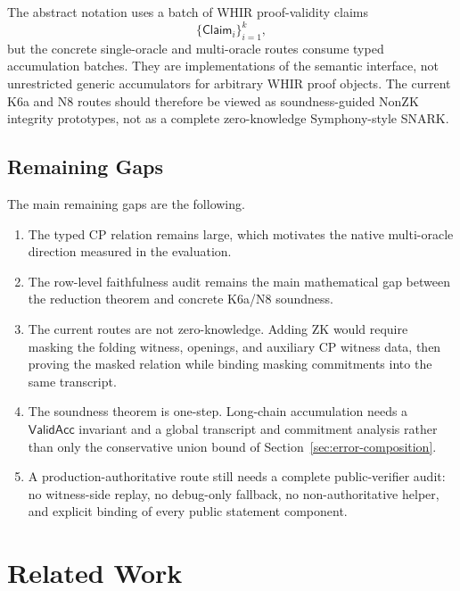 \documentclass[11pt]{article}
\theoremstyle{definition}
\begin{document}
The abstract notation uses a batch of WHIR proof-validity claims
\[
  \{\mathsf{Claim}_i\}_{i=1}^k,
\]
but the concrete single-oracle and multi-oracle routes consume typed
accumulation batches. They are implementations of the semantic interface, not
unrestricted generic accumulators for arbitrary WHIR proof objects. The current
K6a and N8 routes should therefore be viewed as soundness-guided NonZK
integrity prototypes, not as a complete zero-knowledge Symphony-style SNARK.

\subsection{Remaining Gaps}
\label{sec:remaining-gaps}

The main remaining gaps are the following.

\begin{enumerate}
  \item The typed CP relation remains large, which motivates the native
        multi-oracle direction measured in the evaluation.
  \item The row-level faithfulness audit remains the main mathematical gap
        between the reduction theorem and concrete K6a/N8 soundness.
  \item The current routes are not zero-knowledge. Adding ZK would require
        masking the folding witness, openings, and auxiliary CP witness data,
        then proving the masked relation while binding masking commitments into
        the same transcript.
  \item The soundness theorem is one-step. Long-chain accumulation needs a
        \(\mathsf{ValidAcc}\) invariant and a global transcript and commitment
        analysis rather than only the conservative union bound of
        Section~\ref{sec:error-composition}.
  \item A production-authoritative route still needs a complete public-verifier
        audit: no witness-side replay, no debug-only fallback, no
        non-authoritative helper, and explicit binding of every public statement
        component.
\end{enumerate}

\section{Related Work}
\label{sec:related-work}
\end{document}
